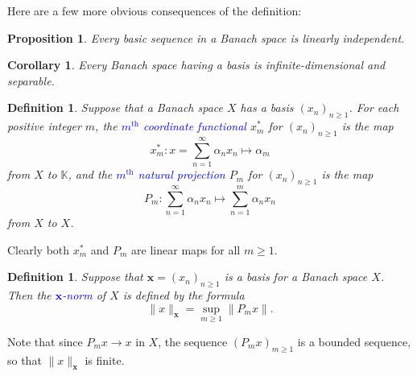 \documentclass[11pt]{article}
\theoremstyle{thmstyle}
\newtheorem{proposition}[theorem]{Proposition}
\theoremstyle{defstyle}
\newtheorem{definition}[theorem]{Definition}
\newtheorem{corollary}[theorem]{Corollary}
\newcommand{\R}{\mathbb{R}}
\newcommand{\bbC}{\mathbb{C}}
\newcommand{\K}{\mathbb{K}} %
\newcommand{\define}[1]{\textcolor{blue}{\textit{#1}}}
\renewcommand{\ge}{\geqslant}
\begin{document}
Here are a few more obvious consequences of the definition:
\begin{proposition}
	Every basic sequence in a Banach space is linearly independent.
\end{proposition}

\begin{corollary}
	Every Banach space having a basis is infinite-dimensional and separable.
\end{corollary}

\begin{definition}
	Suppose that a Banach space $X$ has a basis $(x_n)_{n\ge 1}$. For each positive integer $m$, the \define{$m^{\text{th}}$ coordinate functional} $x_m^\ast$ for $(x_n)_{n\ge 1}$ is the map 
	\begin{equation*}
		x_m^\ast\colon x = \sum_{n = 1}^\infty \alpha_n x_n\longmapsto \alpha_m
	\end{equation*}
	from $X$ to $\K$, and the \define{$m^{\text{th}}$ natural projection} $P_m$ for $(x_n)_{n\ge 1}$ is the map 
	\begin{equation*}
		P_m\colon \sum_{n = 1}^\infty \alpha_n x_n\longmapsto\sum_{n = 1}^m \alpha_n x_n
	\end{equation*}
	from $X$ to $X$.
\end{definition}

Clearly both $x_m^\ast$ and $P_m$ are linear maps for all $m\ge 1$. 

\begin{definition}
	Suppose that $\mathbf x = (x_n)_{n\ge 1}$ is a basis for a Banach space $X$. Then the \define{$\mathbf{x}$-norm} of $X$ is defined by the formula 
	\begin{equation*}
		\|x\|_{\mathbf x} = \sup_{m\ge 1}\left\|P_m x\right\|.
	\end{equation*}
\end{definition}

Note that since $P_mx\to x$ in $X$, the sequence $\left(P_m x\right)_{m\ge 1}$ is a bounded sequence, so that $\|x\|_{\mathbf{x}}$ is finite.
\end{document}
